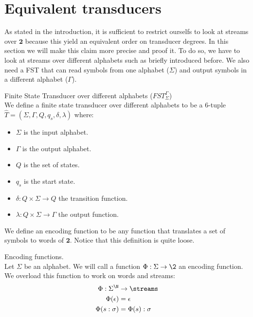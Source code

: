 \section{Equivalent transducers}

As stated in the introduction, it is sufficient to restrict ourselfs to  look at streams over $\mathbf{2}$ because this yield an equivalent order on transducer degrees. In this section we will make this claim more precise and proof it. To do so, we have to look at streams over different alphabets such as briefly introduced before. We also need a FST that can read symbols from one alphabet ($\Sigma$) and output symbols in a different alphabet ($\Gamma$).
\begin{definition}{Finite State Transducer over different alphabets ($FST_\Sigma^\Gamma$)}\\
	We define a finite state transducer over different alphabets to be a $6$-tuple $\hat{T} = (\Sigma, \Gamma, Q,q_s,\delta,\lambda)$ where:
	\begin{itemize}
		\item $\Sigma$ is the input alphabet.
		\item $\Gamma$ is the output alphabet.
		\item $Q$ is the set of states.
		\item $q_s$ is the start state.
		\item $\delta: Q \times \Sigma \to Q$ the transition function.
		\item $\lambda: Q \times \Sigma \to \Gamma$ the output function.
	\end{itemize}
\end{definition}

We define an encoding function to be any function that translates a set of symbols to words of $\mathbf{2}$. Notice that this definition is quite loose. 

\begin{definition}{Encoding functions.}\\
	Let $\Sigma$ be an alphabet.
	We will call a function $\Phi: \Sigma \to \2$ an encoding function. We overload this function to work on words and streams: 
	\begin{align*}
		\Phi: \Sigma^{\N} &\to \streams \\
		\Phi(\epsilon) &= \epsilon \\
		\Phi(s:\sigma) &= \Phi(s) : \sigma
	\end{align*}
\end{definition}



